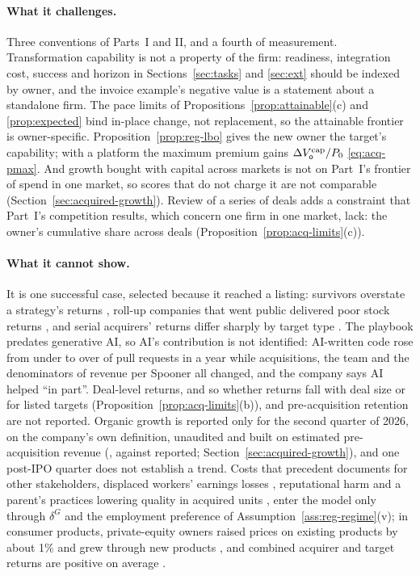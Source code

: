 \paragraph{What it challenges.} Three conventions of Parts~I and II, and a fourth of measurement. Transformation capability is not a property of the firm: readiness, integration cost, success and horizon in Sections~\ref{sec:tasks} and \ref{sec:ext} should be indexed by owner, and the invoice example's negative value is a statement about a standalone firm. The pace limits of Propositions~\ref{prop:attainable}(c) and \ref{prop:expected} bind in-place change, not replacement, so the attainable frontier is owner-specific. Proposition~\ref{prop:reg-lbo} gives the new owner the target's capability; with a platform the maximum premium gains $\Delta V^{\rm cap}_{\mathsf o}/P_0$ \eqref{eq:acq-pmax}. And growth bought with capital across markets is not on Part~I's frontier of spend in one market, so scores that do not charge it are not comparable (Section~\ref{sec:acquired-growth}). Review of a series of deals adds a constraint that Part~I's competition results, which concern one firm in one market, lack: the owner's cumulative share across deals (Proposition~\ref{prop:acq-limits}(c)).

\paragraph{What it cannot show.} It is one successful case, selected because it reached a listing: survivors overstate a strategy's returns \citep{brown1992survivorship}, roll-up companies that went public delivered poor stock returns \citep{brown2005corporate}, and serial acquirers' returns differ sharply by target type \citep{fuller2002what}. The playbook predates generative AI, so AI's contribution is not identified: AI-written code rose from under \acqPrLo{} to over \acqPrHi{} of pull requests in a year while acquisitions, the team and the denominators of revenue per Spooner all changed, and the company says AI helped ``in part''. Deal-level returns, and so whether returns fall with deal size or for listed targets (Proposition~\ref{prop:acq-limits}(b)), and pre-acquisition retention are not reported. Organic growth is reported only for the second quarter of 2026, on the company's own definition, unaudited and built on estimated pre-acquisition revenue (\acqQTwoOrg, against \acqQTwoG{} reported; Section~\ref{sec:acquired-growth}), and one post-IPO quarter does not establish a trend. Costs that precedent documents for other stakeholders, displaced workers' earnings losses \citep{lagaras2026mas}, reputational harm \citep{love2009character} and a parent's practices lowering quality in acquired units \citep{eliason2020how}, enter the model only through $\delta^G$ and the employment preference of Assumption~\ref{ass:reg-regime}(v); in consumer products, private-equity owners raised prices on existing products by about 1\% and grew through new products \citep{fracassi2022barbarians}, and combined acquirer and target returns are positive on average \citep{andrade2001new}.

